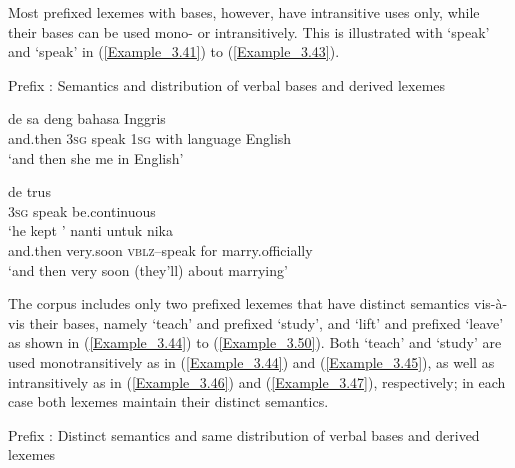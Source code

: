 Most prefixed lexemes with  bases, however, have intransitive uses only, while their bases can be used mono- or intransitively. This is illustrated with  ‘speak’ and  ‘speak’ in (\ref{Example_3.41}) to (\ref{Example_3.43}).



\begin{styleExampleTitle}
Prefix : Semantics and distribution of verbal bases and derived lexemes
\end{styleExampleTitle}

\ea
\label{Example_3.41}
 {de} {} {sa} {deng} {bahasa} {Inggris}\\ %
 and.then  \textsc{3sg}  speak  \textsc{1sg}  with  language  English\\

\glt 
‘and then she  me in English’ \textstyleExampleSource{[081115-001a-Cv.0229]}
\z

\ea
\label{Example_3.42}
\gll  de    trus\\
 \textsc{3sg}  speak  be.continuous\\
\glt 
‘he kept ’ \textstyleExampleSource{[080922-010a-CvNF.0145]}
\z
\ea
\label{Example_3.43}
 {nanti} {} {untuk} {nika}\\ %
 and.then  very.soon  \textsc{vblz}–speak  for  marry.officially\\
 ‘and then very soon (they’ll)  about marrying’ \textstyleExampleSource{[081110-006-CvEx.0050]}
\z


The corpus includes only two prefixed lexemes that have distinct semantics vis-à-vis their  bases, namely  ‘teach’ and prefixed  ‘study’, and  ‘lift’ and prefixed  ‘leave’ as shown in (\ref{Example_3.44}) to (\ref{Example_3.50}). Both  ‘teach’ and  ‘study’ are used monotransitively as in (\ref{Example_3.44}) and (\ref{Example_3.45}), as well as intransitively as in (\ref{Example_3.46}) and (\ref{Example_3.47}), respectively; in each case both lexemes maintain their distinct semantics.



\begin{styleExampleTitle}
{Prefix : Distinct semantics and same distribution of verbal bases and derived lexemes}
\end{styleExampleTitle}

